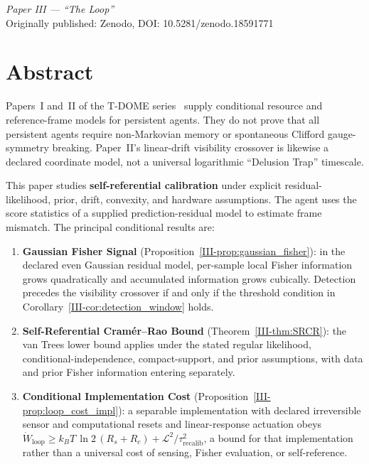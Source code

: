 \documentclass[12pt,a4paper,openany]{book}
\begin{document}
\begin{center}
\textit{Paper III --- ``The Loop''}\\[0.5em]
Originally published: Zenodo, DOI: 10.5281/zenodo.18591771
\end{center}

\bigskip

\section*{Abstract}
Papers~I and~II of the T-DOME
series~\cite{Liu2026TDOME_I,Liu2026TDOME_II} supply conditional
resource and reference-frame models for persistent agents.  They do not
prove that all persistent agents require non-Markovian memory or
spontaneous Clifford gauge-symmetry breaking.  Paper~II's linear-drift
visibility crossover is likewise a declared coordinate model, not a
universal logarithmic ``Delusion Trap'' timescale.

This paper studies \textbf{self-referential calibration} under explicit
residual-likelihood, prior, drift, convexity, and hardware assumptions.
The agent uses the score statistics of a supplied prediction-residual
model to estimate frame mismatch.  The principal conditional results are:
\begin{enumerate}
\item \textbf{Gaussian Fisher Signal}
  (Proposition~\ref{III-prop:gaussian_fisher}):
  in the declared even Gaussian residual model, per-sample local Fisher
  information grows quadratically and accumulated information grows
  cubically.  Detection precedes the visibility crossover if and only if
  the threshold condition in Corollary~\ref{III-cor:detection_window} holds.
\item \textbf{Self-Referential Cram\'{e}r--Rao Bound}
  (Theorem~\ref{III-thm:SRCR}):
  the van Trees lower bound applies under the stated regular likelihood,
  conditional-independence, compact-support, and prior assumptions, with
  data and prior Fisher information entering separately.
\item \textbf{Conditional Implementation Cost}
  (Proposition~\ref{III-prop:loop_cost_impl}):
  a separable implementation with declared irreversible sensor and
  computational resets and linear-response actuation obeys
  $\dot{W}_{\mathrm{loop}}
  \geq k_BT\,\ln 2\,(R_s+R_c)
  + \mathcal{L}^2/\tau_{\mathrm{recalib}}^2$,
  a bound for that implementation rather than a universal cost of
  sensing, Fisher evaluation, or self-reference.
\end{enumerate}
\end{document}
